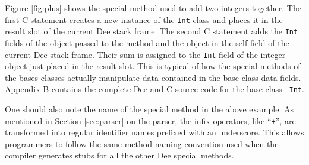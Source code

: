 Figure \ref{fig:plus} shows the special method used to add two
integers together.  The first C statement creates a new instance of
the {\tt Int} class and places it in the result slot of the current
Dee stack frame.  The second C statement adds the {\tt Int} fields of
the object passed to the method and the object in the self field of
the current Dee stack frame.  Their sum is assigned to the {\tt Int}
field of the integer object just placed in the result slot.  This is
typical of how the special methods of the bases classes actually
manipulate data contained in the base class data fields.  Appendix B
contains the complete Dee and C source code for the base class {\tt
Int}.

One should also note the name of the special method in the above
example.  As mentioned in Section \ref{sec:parser} on the parser, the
infix operators, like ``{\tt +}'', are transformed into regular
identifier names prefixed with an underscore.  This allows programmers
to follow the same method naming convention used when the compiler
generates stubs for all the other Dee special methods.




